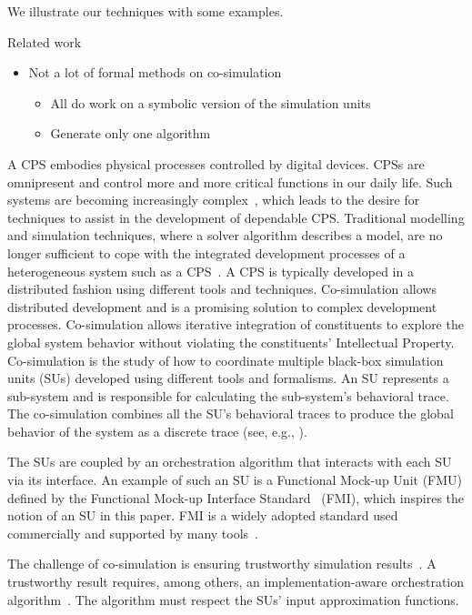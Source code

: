   We illustrate our techniques with some examples.
  
  Related work
  \begin{itemize}
    \item Not a lot of formal methods on co-simulation
    \begin{itemize}
      \item All do work on a symbolic version of the simulation units
      \item Generate only one algorithm
    \end{itemize}
  \end{itemize}

A CPS embodies physical processes controlled by digital devices.
CPSs are omnipresent and control more and more critical functions in our daily life.
Such systems are becoming increasingly complex~\cite{4519604}, which leads to the desire for techniques to assist in the development of dependable CPS.
Traditional modelling and simulation techniques, where a solver algorithm describes a model, are no longer sufficient to cope with the integrated development processes of a heterogeneous system such as a CPS~\cite{FMI2014}.
A CPS is typically developed in a distributed fashion using different tools and techniques. 
Co-simulation allows distributed development and is a promising solution to complex development processes.
Co-simulation allows iterative integration of constituents to explore the global system behavior without violating the constituents' Intellectual Property. 
Co-simulation is the study of how to coordinate multiple black-box simulation units (SUs) developed using different tools and formalisms.
An SU represents a sub-system and is responsible for calculating the sub-system's behavioral trace.
The co-simulation combines all the SU's behavioral traces to produce the global behavior of the system as a discrete trace (see, e.g., \cite{Kubler2000,Gomes2018}).

The SUs are coupled by an orchestration algorithm that interacts with each SU via its interface.
An example of such an SU is a Functional Mock-up Unit (FMU) defined by the Functional Mock-up Interface Standard~\cite{FMI2014} (FMI), which inspires the notion of an SU in this paper. FMI is a widely adopted standard used commercially and supported by many tools~\cite{Tools_FMI}.

The challenge of co-simulation is ensuring trustworthy simulation results~\cite{Gomes2018}. 
A trustworthy result requires, among others, an implementation-aware orchestration algorithm~\cite{Gomes2019,Oakes2021,Gomes2018f,Schweizer2015c}.
The algorithm must respect the SUs' input approximation functions.

